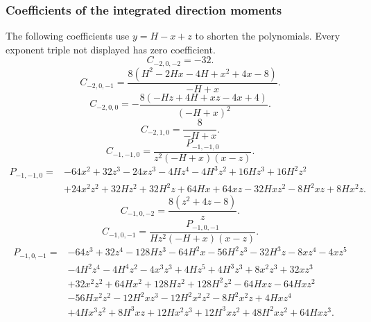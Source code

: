 \subsubsection{Coefficients of the integrated direction moments}
The following coefficients use $y=H-x+z$ to shorten the polynomials.
Every exponent triple not displayed has zero coefficient.
\begin{equation}
C_{-2,0,-2}=-32.
\end{equation}
\begin{equation}
C_{-2,0,-1}=\frac{8 \left(H^{2} - 2 H x - 4 H + x^{2} + 4 x - 8\right)}{- H + x}.
\end{equation}
\begin{equation}
C_{-2,0,0}=- \frac{8 \left(- H z + 4 H + x z - 4 x + 4\right)}{\left(- H + x\right)^{2}}.
\end{equation}
\begin{equation}
C_{-2,1,0}=\frac{8}{- H + x}.
\end{equation}
\begin{equation}
C_{-1,-1,0}=\frac{P_{-1,-1,0}}{z^{2} \left(- H + x\right) \left(x - z\right)}.
\end{equation}
\begin{equation}
\begin{aligned}
P_{-1,-1,0}={}& - 64 x^{2} + 32 z^{3} - 24 x z^{3} - 4 H z^{4} - 4 H^{3} z^{2} + 16 H z^{3} + 16 H^{2} z^{2}\\
& + 24 x^{2} z^{2} + 32 H z^{2} + 32 H^{2} z + 64 H x + 64 x z - 32 H x z^{2} - 8 H^{2} x z + 8 H x^{2} z.
\end{aligned}
\end{equation}
\begin{equation}
C_{-1,0,-2}=\frac{8 \left(z^{2} + 4 z - 8\right)}{z}.
\end{equation}
\begin{equation}
C_{-1,0,-1}=\frac{P_{-1,0,-1}}{H z^{2} \left(- H + x\right) \left(x - z\right)}.
\end{equation}
\begin{equation}
\begin{aligned}
P_{-1,0,-1}={}& - 64 z^{3} + 32 z^{4} - 128 H z^{3} - 64 H^{2} x - 56 H^{2} z^{3} - 32 H^{3} z - 8 x z^{4} - 4 x z^{5}\\
& - 4 H^{2} z^{4} - 4 H^{4} z^{2} - 4 x^{3} z^{3} + 4 H z^{5} + 4 H^{3} z^{3} + 8 x^{2} z^{3} + 32 x z^{3}\\
& + 32 x^{2} z^{2} + 64 H x^{2} + 128 H z^{2} + 128 H^{2} z^{2} - 64 H x z - 64 H x z^{2}\\
& - 56 H x^{2} z^{2} - 12 H^{2} x z^{3} - 12 H^{2} x^{2} z^{2} - 8 H^{2} x^{2} z + 4 H x z^{4}\\
& + 4 H x^{3} z^{2} + 8 H^{3} x z + 12 H x^{2} z^{3} + 12 H^{3} x z^{2} + 48 H^{2} x z^{2} + 64 H x z^{3}.
\end{aligned}
\end{equation}
